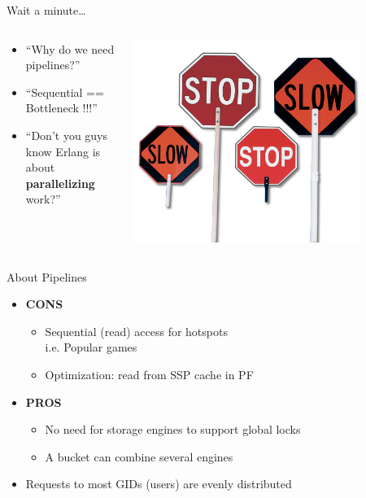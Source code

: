 \documentclass[aspectratio=43]{beamer}
\begin{document}
\begin{frame}{Wait a minute\dots}
    \begin{columns}
        \begin{column}[c]{0.5\textwidth}
            \begin{itemize}
                \item ``Why do we need pipelines?''
                \item ``Sequential == Bottleneck !!!''
                \item ``Don't you guys know Erlang is about \textbf{parallelizing} work?''
            \end{itemize}
        \end{column}
        \begin{column}[c]{0.5\textwidth}
            \includegraphics[width=0.8\textwidth]{images/slow.png}
        \end{column}
    \end{columns}
\end{frame}

\begin{frame}{About Pipelines}
    \begin{itemize}
        \item \textbf{CONS}
            \begin{itemize}
                \item Sequential (read) access for hotspots\\
                    i.e. Popular games
                \item Optimization: read from SSP cache in PF
            \end{itemize}
        \pause
        \item \textbf{PROS}
            \begin{itemize}
                \item No need for storage engines to support global locks
                \item A bucket can combine several engines
            \end{itemize}
        \pause
        \item Requests to most GIDs (users) are evenly distributed
    \end{itemize}
\end{frame}
\end{document}
